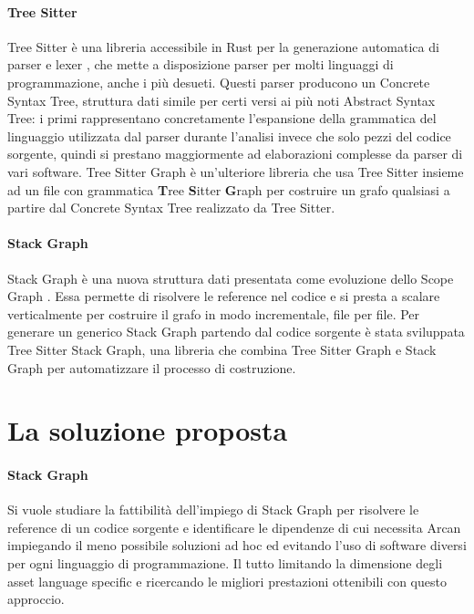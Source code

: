 \paragraph{Tree Sitter}

Tree Sitter \cite{TreeSitter} \`e una libreria accessibile in Rust per la generazione automatica di parser e lexer \cite{sestoft2017programming}, che mette a disposizione parser per molti linguaggi di programmazione, anche i pi\`u desueti. Questi parser producono un Concrete Syntax Tree, struttura dati simile per certi versi ai pi\`u noti Abstract Syntax Tree: i primi rappresentano concretamente l'espansione della grammatica del linguaggio utilizzata dal parser durante l'analisi invece che solo pezzi del codice sorgente, quindi si prestano maggiormente ad elaborazioni complesse da parser di vari software. Tree Sitter Graph \`e un'ulteriore libreria che usa Tree Sitter insieme ad un file con grammatica \textbf{T}ree \textbf{S}itter \textbf{G}raph per costruire un grafo qualsiasi a partire dal Concrete Syntax Tree realizzato da Tree Sitter.

\paragraph{Stack Graph}

Stack Graph \cite{StackGraph} \`e una nuova struttura dati presentata \cite{StackGraphNameResolutionAtScale} come evoluzione dello Scope Graph \cite{ScopeGraph}. Essa permette di risolvere le reference nel codice e si presta a scalare verticalmente per costruire il grafo in modo incrementale, file per file. Per generare un generico Stack Graph partendo dal codice sorgente \`e stata sviluppata Tree Sitter Stack Graph, una libreria che combina Tree Sitter Graph e Stack Graph per automatizzare il processo di costruzione.

\section{La soluzione proposta}

\paragraph{Stack Graph}

Si vuole studiare la fattibilit\`a dell'impiego di Stack Graph per risolvere le reference di un codice sorgente e identificare le dipendenze di cui necessita Arcan impiegando il meno possibile soluzioni ad hoc ed evitando l'uso di software diversi per ogni linguaggio di programmazione. Il tutto limitando la dimensione degli asset language specific e ricercando le migliori prestazioni ottenibili con questo approccio.


